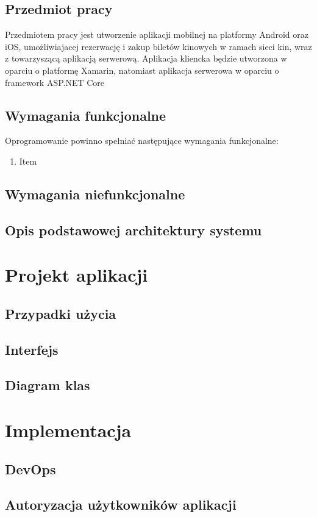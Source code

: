 \section{Przedmiot pracy}
Przedmiotem pracy jest utworzenie aplikacji mobilnej na platformy Android oraz iOS, umożliwiajacej rezerwację i zakup biletów kinowych w ramach sieci kin, wraz z towarzyszącą aplikacją serwerową. Aplikacja kliencka będzie utworzona w oparciu o platformę Xamarin, natomiast aplikacja serwerowa w oparciu o framework ASP.NET Core
\section{Wymagania funkcjonalne}
Oprogramowanie powinno spełniać następujące wymagania funkcjonalne:
\begin{enumerate}
\item Item
\end{enumerate}
\section{Wymagania niefunkcjonalne}
\section{Opis podstawowej architektury systemu}
\chapter{Projekt aplikacji}
\section{Przypadki użycia}
\section{Interfejs}
\section{Diagram klas}
\chapter{Implementacja}
\section{DevOps}
\section{Autoryzacja użytkowników aplikacji}
